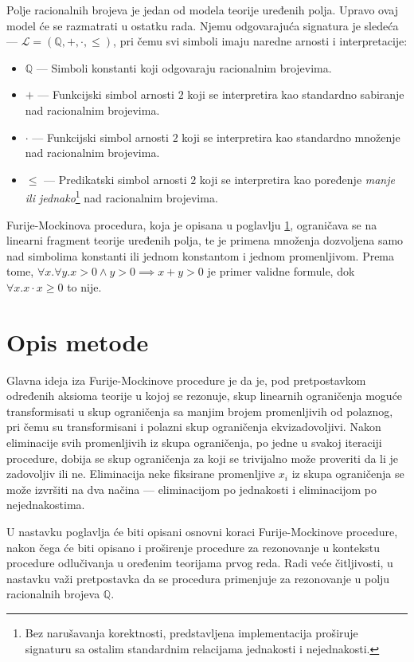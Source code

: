 \documentclass[a4paper,10pt]{article}
\begin{document}
Polje racionalnih brojeva je jedan od modela teorije uređenih polja. Upravo ovaj model će se razmatrati u ostatku rada. Njemu odgovarajuća signatura je sledeća --- $\mathcal{L} = (\mathbb{Q}, +, \cdot, \leq)$, pri čemu svi simboli imaju naredne arnosti i interpretacije:
\begin{itemize}
    \item $\mathbb{Q}$ --- Simboli konstanti koji odgovaraju racionalnim brojevima.
    \item $+$ --- Funkcijski simbol arnosti $2$ koji se interpretira kao standardno sabiranje nad racionalnim brojevima.
    \item $\cdot$ --- Funkcijski simbol arnosti $2$ koji se interpretira kao standardno množenje nad racionalnim brojevima.
    \item $\leq$ --- Predikatski simbol arnosti $2$ koji se interpretira kao poređenje \textit{manje ili jednako}\footnote{Bez narušavanja korektnosti, predstavljena implementacija proširuje signaturu sa ostalim standardnim relacijama jednakosti i nejednakosti.} nad racionalnim brojevima.
\end{itemize}

Furije-Mockinova procedura, koja je opisana u poglavlju \ref{sec:opis_metode}, ograničava se na linearni fragment teorije uređenih polja, te je primena množenja dozvoljena samo nad simbolima konstanti ili jednom konstantom i jednom promenljivom. Prema tome, $\forall x.\forall y.x > 0 \land y > 0 \implies x + y > 0$ je primer validne formule, dok $\forall x.x \cdot x \geq 0$ to nije.

\section{Opis metode}
\label{sec:opis_metode}

Glavna ideja iza Furije-Mockinove procedure je da je, pod pretpostavkom određenih aksioma teorije u kojoj se rezonuje, skup linearnih ograničenja moguće transformisati u skup ograničenja sa manjim brojem promenljivih od polaznog, pri čemu su transformisani i polazni skup ograničenja ekvizadovoljivi. Nakon eliminacije svih promenljivih iz skupa ograničenja, po jedne u svakoj iteraciji procedure, dobija se skup ograničenja za koji se trivijalno može proveriti da li je zadovoljiv ili ne. Eliminacija neke fiksirane promenljive $x_i$ iz skupa ograničenja se može izvršiti na dva načina --- eliminacijom po jednakosti i eliminacijom po nejednakostima.

U nastavku poglavlja će biti opisani osnovni koraci Furije-Mockinove procedure, nakon čega će biti opisano i proširenje procedure za rezonovanje u kontekstu procedure odlučivanja u oređenim teorijama prvog reda. Radi veće čitljivosti, u nastavku važi pretpostavka da se procedura primenjuje za rezonovanje u polju racionalnih brojeva $\mathbb{Q}$.
\end{document}
